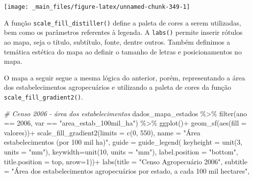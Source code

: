 \documentclass[
  brazilian,
]{book}
\newenvironment{Shaded}{\begin{snugshade}}{\end{snugshade}}
\newcommand{\AttributeTok}[1]{\textcolor[rgb]{0.77,0.63,0.00}{#1}}
\newcommand{\CommentTok}[1]{\textcolor[rgb]{0.56,0.35,0.01}{\textit{#1}}}
\newcommand{\DecValTok}[1]{\textcolor[rgb]{0.00,0.00,0.81}{#1}}
\newcommand{\FunctionTok}[1]{\textcolor[rgb]{0.00,0.00,0.00}{#1}}
\newcommand{\NormalTok}[1]{#1}
\newcommand{\SpecialCharTok}[1]{\textcolor[rgb]{0.00,0.00,0.00}{#1}}
\newcommand{\StringTok}[1]{\textcolor[rgb]{0.31,0.60,0.02}{#1}}
\begin{document}
\begin{center}\texttt{[image: \_main\_files/figure-latex/unnamed-chunk-349-1]} \end{center}

A função \texttt{scale\_fill\_distiller()} define a paleta de cores a serem utilizadas, bem como os parâmetros referentes à legenda. A \texttt{labs()} permite inserir rótulos ao mapa, seja o título, subtítulo, fonte, dentre outros. Também definimos a temática estética do mapa ao definir o tamanho de letras e posicionamentos no mapa.

O mapa a seguir segue a mesma lógica do anterior, porém, representando a área dos estabelecimentos agropecuários e utilizando a paleta de cores da função \texttt{scale\_fill\_gradient2()}.

\begin{Shaded}
\begin{Highlighting}[]
\CommentTok{\# Censo 2006 {-} área dos estabelecimentos}
\NormalTok{dados\_mapa\_estados }\SpecialCharTok{\%\textgreater{}\%} 
  \FunctionTok{filter}\NormalTok{(ano }\SpecialCharTok{==} \DecValTok{2006}\NormalTok{,}
\NormalTok{         var }\SpecialCharTok{==} \StringTok{"area\_estab\_100mil\_ha"}\NormalTok{) }\SpecialCharTok{\%\textgreater{}\%} 
  \FunctionTok{ggplot}\NormalTok{()}\SpecialCharTok{+}
  \FunctionTok{geom\_sf}\NormalTok{(}\FunctionTok{aes}\NormalTok{(}\AttributeTok{fill =}\NormalTok{ valores))}\SpecialCharTok{+}
  \FunctionTok{scale\_fill\_gradient2}\NormalTok{(}\AttributeTok{limits =} \FunctionTok{c}\NormalTok{(}\DecValTok{0}\NormalTok{, }\DecValTok{550}\NormalTok{),}
                       \AttributeTok{name =} \StringTok{"Área estabelecimentos (por 100 mil ha)"}\NormalTok{,}
                       \AttributeTok{guide =} \FunctionTok{guide\_legend}\NormalTok{(}
                         \AttributeTok{keyheight =} \FunctionTok{unit}\NormalTok{(}\DecValTok{3}\NormalTok{, }\AttributeTok{units =} \StringTok{"mm"}\NormalTok{),}
                         \AttributeTok{keywidth=}\FunctionTok{unit}\NormalTok{(}\DecValTok{10}\NormalTok{, }\AttributeTok{units =} \StringTok{"mm"}\NormalTok{),}
                         \AttributeTok{label.position =} \StringTok{"bottom"}\NormalTok{,}
                         \AttributeTok{title.position =} \StringTok{\textquotesingle{}top\textquotesingle{}}\NormalTok{, }\AttributeTok{nrow=}\DecValTok{1}\NormalTok{))}\SpecialCharTok{+}
  \FunctionTok{labs}\NormalTok{(}\AttributeTok{title =} \StringTok{"Censo Agropecuário 2006"}\NormalTok{,}
       \AttributeTok{subtitle =} \StringTok{"Área dos estabelecimentos agropecuários por estado, a cada 100 mil hectares"}\NormalTok{,}

\end{Highlighting}
\end{Shaded}
\end{document}
